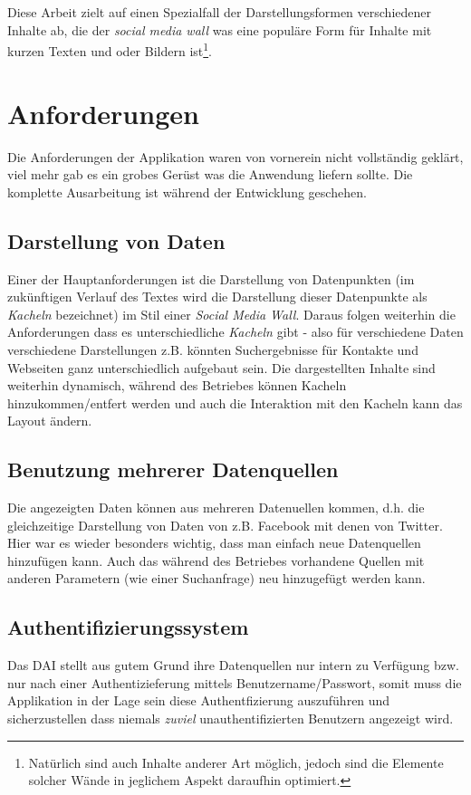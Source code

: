 \documentclass[12pt,twoside]{book}
\begin{document}
Diese Arbeit zielt auf einen Spezialfall der Darstellungsformen verschiedener Inhalte ab, die der \textit{social media wall} was eine populäre Form für Inhalte mit kurzen Texten und oder Bildern ist\footnote{Natürlich sind auch Inhalte anderer Art möglich, jedoch sind die Elemente solcher Wände in jeglichem Aspekt daraufhin optimiert.}.

\section*{Anforderungen}

Die Anforderungen der Applikation waren von vornerein nicht vollständig geklärt, viel mehr gab es ein grobes Gerüst was die Anwendung liefern sollte. Die komplette Ausarbeitung ist während der Entwicklung geschehen.

\subsection*{Darstellung von Daten}

  Einer der Hauptanforderungen ist die Darstellung von Datenpunkten (im zukünftigen Verlauf des Textes wird die Darstellung dieser Datenpunkte als \textit{Kacheln} bezeichnet) im Stil einer \textit{Social Media Wall}. Daraus folgen weiterhin die Anforderungen dass es unterschiedliche \textit{Kacheln} gibt - also für verschiedene Daten verschiedene Darstellungen z.B. könnten Suchergebnisse für Kontakte und Webseiten ganz unterschiedlich aufgebaut sein. Die dargestellten Inhalte sind weiterhin dynamisch, während des Betriebes können Kacheln hinzukommen/entfert werden und auch die Interaktion mit den Kacheln kann das Layout ändern.

\subsection*{Benutzung mehrerer Datenquellen}
  Die angezeigten Daten können aus mehreren Datenuellen kommen, d.h. die gleichzeitige Darstellung von Daten von z.B. Facebook mit denen von Twitter. Hier war es wieder besonders wichtig, dass man einfach neue Datenquellen hinzufügen kann. Auch das während des Betriebes vorhandene Quellen mit anderen Parametern (wie einer Suchanfrage) neu hinzugefügt werden kann.

\subsection*{Authentifizierungssystem}
  Das DAI stellt aus gutem Grund ihre Datenquellen nur intern zu Verfügung bzw. nur nach einer Authentizieferung mittels Benutzername/Passwort, somit muss die Applikation in der Lage sein diese Authentfizierung auszuführen und sicherzustellen dass niemals \textit{zuviel} unauthentifizierten Benutzern angezeigt wird.
\end{document}
